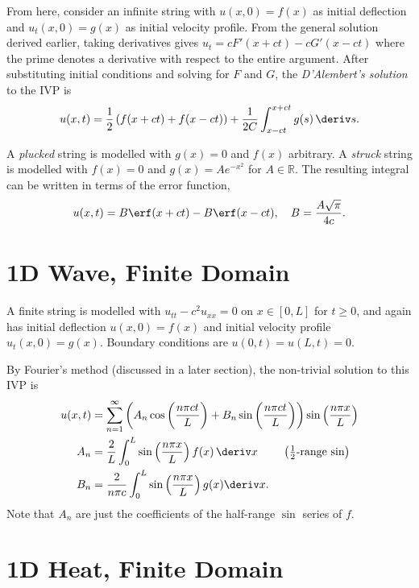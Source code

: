 \documentclass[10pt, a4paper]{article}
\begin{document}
\begin{landscape}
\begin{multicols*}{2}
    From here, consider an infinite string with \(u(x, 0) = f(x)\) as initial deflection
    and \(u_t(x, 0) = g(x)\) as initial velocity profile. From the general solution derived earlier,
    taking derivatives gives \(u_t = c F'(x+ct) - c G'(x - ct)\) where the prime denotes a derivative with
    respect to the entire argument. After substituting initial conditions and solving for \(F\) and \(G\),
    the \emph{D'Alembert's solution} to the IVP is
    \[
        u(x, t) = \frac{1}{2}\left(f(x + ct) + f(x - ct) \right)
        + \frac{1}{2C} \int_{x - ct}^{x + ct} g(s) \,\deriv s.
    \]

    A \emph{plucked} string is modelled with \(g(x) = 0\) and \(f(x)\) arbitrary.
    A \emph{struck} string is modelled with \(f(x) = 0\) and \(g(x) = A e^{-x^2}\) for \(A \in \mathbb{R}\).
    The resulting integral can be written in terms of the error function,
    \[
        u(x, t) = B \erf(x + ct) - B \erf(x - ct),
        \quad
        B = \frac{A \sqrt{\pi}}{4c}.
    \]

    \section{1D Wave, Finite Domain}

    A finite string is modelled with \(u_{tt} - c^2 u_{xx} = 0\) on \(x \in [0, L]\) for \(t \geq 0\),
    and again has initial deflection \(u(x, 0) = f(x)\) and initial velocity profile \(u_t(x, 0) = g(x)\).
    Boundary conditions are \(u(0, t) = u(L, t) = 0\).

    By Fourier's method (discussed in a later section), the non-trivial solution to this IVP is
    \begin{align*}
        u(x, t) &= \sum_{n=1}^{\infty} \left(
            A_n \cos\left(\frac{n \pi c t}{L}\right) + B_n \sin\left(\frac{n \pi ct}{L}\right)
        \right) \sin \left(\frac{n \pi x}{L}\right) \\
        A_n &= \frac{2}{L} \int_0^L \sin\left(\frac{n \pi x}{L}\right) f(x) \,\deriv x
            \tag*{
                \(\left(\frac{1}{2} \text{-range sin}\right)\)
            } \\
        B_n &= \frac{2}{n \pi c} \int_0^L \sin\left(\frac{n \pi x}{L}\right) g(x) \deriv x.
    \end{align*}
    Note that \(A_n\) are just the coefficients of the half-range \(\sin\) series of \(f\).

    \section{1D Heat, Finite Domain}


\end{multicols*}
\end{landscape}
\end{document}

